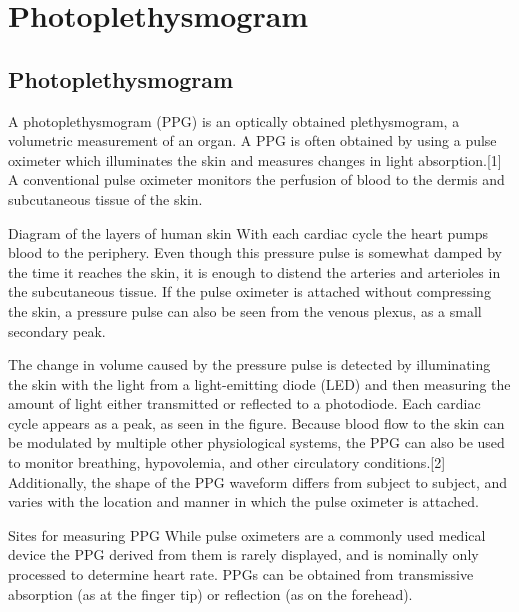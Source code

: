 \chapter{Photoplethysmogram} %

\label{Chapter5} %


\section{Photoplethysmogram}
\cite{wiki-PPG}
A photoplethysmogram (PPG) is an optically obtained plethysmogram,
a volumetric measurement of an organ.
A PPG is often obtained by using a pulse oximeter
which illuminates the skin and measures changes in light absorption.[1]
A conventional pulse oximeter monitors the perfusion of blood to the dermis
and subcutaneous tissue of the skin.

Diagram of the layers of human skin With each cardiac cycle the heart pumps
blood to the periphery. Even though this pressure pulse is somewhat damped
by the time it reaches the skin, it is enough to distend the arteries and
arterioles in the subcutaneous tissue.
If the pulse oximeter is attached without compressing the skin,
a pressure pulse can also be seen from the venous plexus, as a small secondary peak.

The change in volume caused by the pressure pulse is detected by illuminating the skin
with the light from a light-emitting diode (LED) and then measuring the amount of
light either transmitted or reflected to a photodiode.
Each cardiac cycle appears as a peak, as seen in the figure.
Because blood flow to the skin can be modulated by multiple other physiological systems,
the PPG can also be used to monitor breathing, hypovolemia,
and other circulatory conditions.[2] Additionally, the shape of the PPG waveform
differs from subject to subject, and varies with the location and
manner in which the pulse oximeter is attached.

Sites for measuring PPG
While pulse oximeters are a commonly used medical device the PPG derived from them is
rarely displayed, and is nominally only processed to determine heart rate.
PPGs can be obtained from transmissive absorption (as at the finger tip) or
reflection (as on the forehead).

